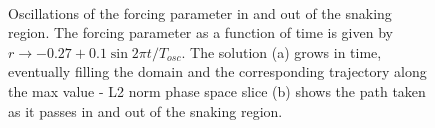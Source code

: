 \documentclass[pre,preprint,superscriptaddress]{revtex4-1}
\begin{document}
\begin{figure}[!htb]
\begin{center}
    \mbox{
       \quad
      }
    \caption{Oscillations of the forcing parameter in and out of the snaking region.  The forcing parameter as a function of time is given by $r\rightarrow -0.27+ 0.1\sin2\pi t/T_{osc}$.  The solution (a) grows in time, eventually filling the domain and the corresponding trajectory along the max value - L2 norm phase space slice (b) shows the path taken as it passes in and out of the snaking region. }
    \label{fig:FillDomain}
  \end{center}
\end{figure} 
\end{document}
